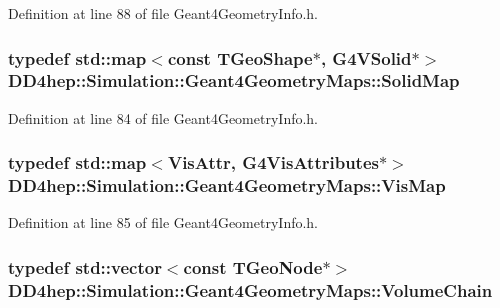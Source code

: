 Definition at line 88 of file Geant4GeometryInfo.h.\hypertarget{namespace_d_d4hep_1_1_simulation_1_1_geant4_geometry_maps_a5591dbffcd2e6432004034209abd630e}{
\subsubsection[{SolidMap}]{\setlength{\rightskip}{0pt plus 5cm}typedef std::map$<$const TGeoShape$\ast$, G4VSolid$\ast$$>$ {\bf DD4hep::Simulation::Geant4GeometryMaps::SolidMap}}}
\label{namespace_d_d4hep_1_1_simulation_1_1_geant4_geometry_maps_a5591dbffcd2e6432004034209abd630e}


Definition at line 84 of file Geant4GeometryInfo.h.\hypertarget{namespace_d_d4hep_1_1_simulation_1_1_geant4_geometry_maps_af7bb137248b77047dc34ff68d67225eb}{
\subsubsection[{VisMap}]{\setlength{\rightskip}{0pt plus 5cm}typedef std::map$<$VisAttr, G4VisAttributes$\ast$$>$ {\bf DD4hep::Simulation::Geant4GeometryMaps::VisMap}}}
\label{namespace_d_d4hep_1_1_simulation_1_1_geant4_geometry_maps_af7bb137248b77047dc34ff68d67225eb}


Definition at line 85 of file Geant4GeometryInfo.h.\hypertarget{namespace_d_d4hep_1_1_simulation_1_1_geant4_geometry_maps_a23aa6ab8c70ef8f0c800d00db6a7bb53}{
\subsubsection[{VolumeChain}]{\setlength{\rightskip}{0pt plus 5cm}typedef std::vector$<$const TGeoNode$\ast$$>$ {\bf DD4hep::Simulation::Geant4GeometryMaps::VolumeChain}}}
\label{namespace_d_d4hep_1_1_simulation_1_1_geant4_geometry_maps_a23aa6ab8c70ef8f0c800d00db6a7bb53}


